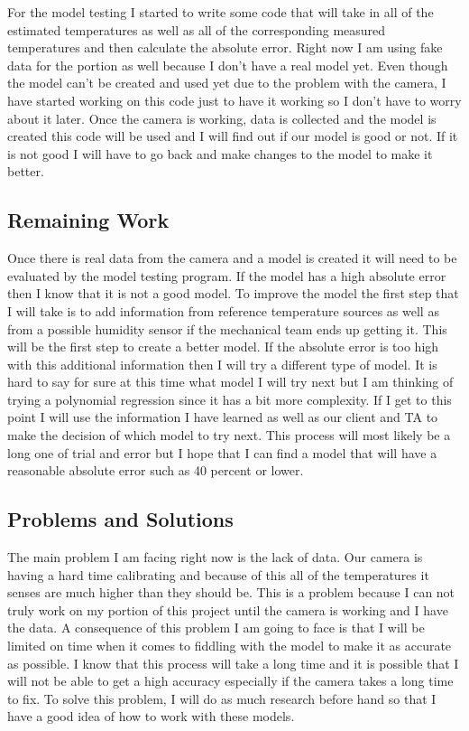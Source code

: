 \documentclass[onecolumn, draftclsnofoot,10pt, compsoc]{IEEEtran}
\begin{document}
For the model testing I started to write some code that will take in all of the estimated temperatures as well as all of the corresponding measured temperatures and then calculate the absolute error. Right now I am using fake data for the portion as well because I don't have a real model yet. Even though the model can’t be created and used yet due to the problem with the camera, I have started working on this code just to have it working so I don't have to worry about it later. Once the camera is working, data is collected and the model is created this code will be used and I will find out if our model is good or not. If it is not good I will have to go back and make changes to the model to make it better. 



\subsection{Remaining Work}

Once there is real data from the camera and a model is created it will need to be evaluated by the model testing program. If the model has a high absolute error then I know that it is not a good model. To improve the model the first step that I will take is to add information from reference temperature sources as well as from a possible humidity sensor if the mechanical team ends up getting it. This will be the first step to create a better model. If the absolute error is too high with this additional information then I will try a different type of model. It is hard to say for sure at this time what model I will try next but I am thinking of trying a polynomial regression since it has a bit more complexity. If I get to this point I will use the information I have learned as well as our client and TA to make the decision of which model to try next. This process will most likely be a long one of trial and error but I hope that I can find a model that will have a reasonable absolute error such as 40 percent or lower.

\subsection{Problems and Solutions}

The main problem I am facing right now is the lack of data. Our camera is having a hard time calibrating and because of this all of the temperatures it senses are much higher than they should be. This is a problem because I can not truly work on my portion of this project until the camera is working and I have the data. A consequence of this problem I am going to face is that I will be limited on time when it comes to fiddling with the model to make it as accurate as possible. I know that this process will take a long time and it is possible that I will not be able to get a high accuracy especially if the camera takes a long time to fix. To solve this problem, I will do as much research before hand so that I have a good idea of how to work with these models.
\end{document}
